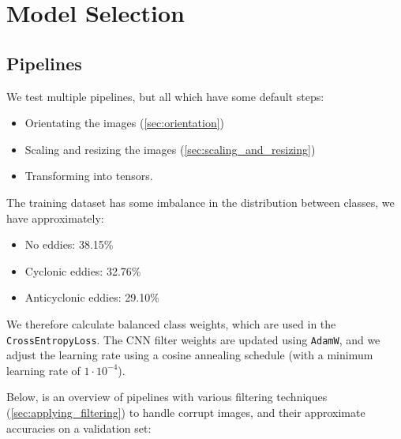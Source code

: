 \documentclass[12pt,a4paper,english]{article}
\begin{document}
    \section{Model Selection}

    \subsection{Pipelines} \label{sec:pipelines}

    We test multiple pipelines, but all which have some default steps:
    \begin{itemize}
        \item Orientating the images (\ref{sec:orientation})
        \item Scaling and resizing the images (\ref{sec:scaling_and_resizing})
        \item Transforming into tensors.
    \end{itemize}

    The training dataset has some imbalance in the distribution between classes, we have approximately:
    \begin{itemize}
        \item No eddies: 38.15\%
        \item Cyclonic eddies: 32.76\%
        \item Anticyclonic eddies: 29.10\%
    \end{itemize}

    We therefore calculate balanced class weights, which are used in the \verb|CrossEntropyLoss|.
    The CNN filter weights are updated using \verb|AdamW|, and we adjust the learning rate using a cosine annealing schedule (with a minimum learning rate of $1\cdot 10^{-4}$).

    Below, is an overview of pipelines with various filtering techniques (\ref{sec:applying_filtering}) to handle corrupt images, and their approximate accuracies on a validation set:
\end{document}
